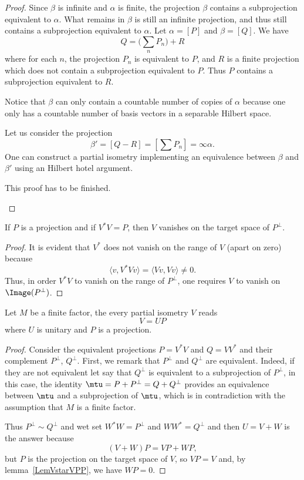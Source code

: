 \begin{proof}
	Since $\beta$ is infinite and $\alpha$ is finite, the projection $\beta$ contains a subprojection equivalent to $\alpha$. What remains in $\beta$ is still an infinite projection, and thus still contains a subprojection equivalent to $\alpha$. Let $\alpha=[P]$ and $\beta=[Q]$. We have
	\[
		Q=\big( \sum_nP_n \big)+R
	\]
	where for each $n$, the projection $P_n$ is equivalent to $P$, and $R$ is a finite projection which does not contain a subprojection equivalent to $P$. Thus $P$ contains a subprojection equivalent to $R$.

	Notice that $\beta$ can only contain a countable number of copies of $\alpha$ because one only has a countable number of basis vectors in a separable Hilbert space.

	Let us consider the projection
	\begin{equation}
		\beta'=[Q-R]=[\sum P_n]=\infty\alpha.
	\end{equation}
	One can construct a partial isometry implementing an equivalence between $\beta$ and $\beta'$ using an Hilbert hotel argument.
	\begin{probleme}
		This proof has to be finished.
	\end{probleme}
\end{proof}

\begin{lemma}	\label{LemVstarVPP}
	If $P$ is a projection and if $V^*V=P$, then $V$ vanishes on the target space of $P^{\perp}$.
\end{lemma}

\begin{proof}
	It is evident that $V^*$ does not vanish on the range of $V$ (apart on zero) because
	\[
		\langle v, V^*Vv\rangle =\langle Vv, Vv\rangle \neq 0.
	\]
	Thus, in order $V^*V$ to vanish on the range of $P^{\perp}$, one requires $V$ to vanish on $\Image(P^{\perp})$.
\end{proof}

\begin{lemma}		\label{LemfinifactisemVUP}
	Let $M$ be a finite factor, the every partial isometry $V$ reads
	\begin{equation}
		V=UP
	\end{equation}
	where $U$ is unitary and $P$ is a projection.
\end{lemma}

\begin{proof}
	Consider the equivalent projections $P=V^*V$ and $Q=VV^*$ and their complement $P^{\perp}$, $Q^{\perp}$. First, we remark that $P^{\perp}$ and $Q^{\perp}$ are equivalent. Indeed, if they are not equivalent let say that $Q^{\perp}$ is equivalent to a subprojection of $P^{\perp}$, in this case, the identity $\mtu=P+P^{\perp}=Q+Q^{\perp}$ provides an equivalence between $\mtu$ and a subprojection of $\mtu$, which is in contradiction with the assumption that $M$ is a finite factor.

	Thus $P^{\perp}\sim Q^{\perp}$ and wet set $W^*W=P^{\perp}$ and $WW^*=Q^{\perp}$ and then $U=V+W$ is the answer because
	\[
		(V+W)P=VP+WP,
	\]
	but $P$ is the projection on the target space of $V$, so $VP=V$ and, by lemma~\ref{LemVstarVPP}, we have $WP=0$.
\end{proof}

